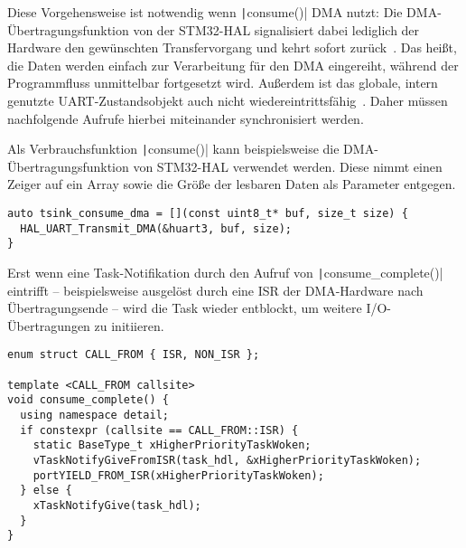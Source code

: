 Diese Vorgehensweise ist notwendig wenn \texttt|consume()| DMA nutzt:
Die DMA-Übertragungsfunktion von der STM32-HAL signalisiert dabei lediglich der
Hardware den gewünschten Transfervorgang und kehrt sofort
zurück~\cite{HAL_UART_Transmit_DMA}. Das heißt, die Daten werden einfach zur
Verarbeitung für den DMA eingereiht, während der Programmfluss unmittelbar
fortgesetzt wird. Außerdem ist das globale, intern genutzte UART-Zustandsobjekt
auch nicht wiedereintrittsfähig\footnotemark{}~\cite{stm32_hal_reentrancy}.
Daher müssen nachfolgende Aufrufe hierbei miteinander synchronisiert werden.


Als Verbrauchsfunktion \texttt|consume()| kann beispielsweise die
DMA-Übertragungsfunktion von STM32-HAL verwendet werden. Diese nimmt einen
Zeiger auf ein Array sowie die Größe der lesbaren Daten als Parameter entgegen.

\begin{code}
\begin{verbatim}
auto tsink_consume_dma = [](const uint8_t* buf, size_t size) {
  HAL_UART_Transmit_DMA(&huart3, buf, size);
}
\end{verbatim}
\end{code}

Erst wenn eine Task-Notifikation durch den Aufruf von
\texttt|consume_complete()| eintrifft -- beispielsweise ausgelöst durch
eine \ac{ISR} der DMA-Hardware nach Übertragungsende -- wird die Task wieder
entblockt, um weitere I/O-Übertragungen zu initiieren.

\begin{code}
\begin{verbatim}
enum struct CALL_FROM { ISR, NON_ISR };

template <CALL_FROM callsite>
void consume_complete() {
  using namespace detail;
  if constexpr (callsite == CALL_FROM::ISR) {
    static BaseType_t xHigherPriorityTaskWoken;
    vTaskNotifyGiveFromISR(task_hdl, &xHigherPriorityTaskWoken);
    portYIELD_FROM_ISR(xHigherPriorityTaskWoken);
  } else {
    xTaskNotifyGive(task_hdl);
  }
}
\end{verbatim}
\end{code}

